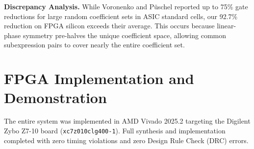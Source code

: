\documentclass[11pt,a4paper]{article}
\begin{document}
\textbf{Discrepancy Analysis.} While Voronenko and P\"uschel reported up to 75\% gate reductions for large random coefficient sets in ASIC standard cells, our 92.7\% reduction on FPGA silicon exceeds their average. This occurs because linear-phase symmetry pre-halves the unique coefficient space, allowing common subexpression pairs to cover nearly the entire coefficient set.

\section{FPGA Implementation and Demonstration}
\label{sec:fpga}

The entire system was implemented in AMD Vivado 2025.2 targeting the Digilent Zybo Z7-10 board (\texttt{xc7z010clg400-1}). Full synthesis and implementation completed with zero timing violations and zero Design Rule Check (DRC) errors.
\end{document}
